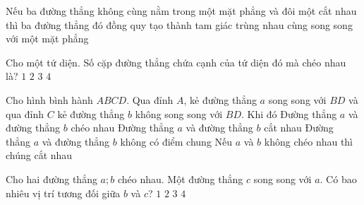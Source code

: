 \begin{ex}%
	Nếu ba đường thẳng không cùng nằm trong một mặt phẳng và đôi một cắt nhau thì ba đường thẳng đó
	\choice
	{\True đồng quy}
	{tạo thành tam giác}
	{trùng nhau}
	{cùng song song với một mặt phẳng}
\end{ex}
\begin{ex}%
	Cho một tứ diện. Số cặp đường thẳng chứa cạnh của tứ diện đó mà chéo nhau là?
	\choice
	{$1$}
	{$2$}
	{\True $3$}
	{$4$}
	\loigiai{
	}
\end{ex}
\begin{ex}%
	Cho hình bình hành $ABCD$. Qua đỉnh $A$, kẻ đường thẳng $a$ song song với $BD$ và qua đỉnh $C$ kẻ đường thẳng $b$ không song song với $BD$. Khi đó
	\choice
	{Đường thẳng $a$ và đường thẳng $b$ chéo nhau}
	{Đường thẳng $a$ và đường thẳng $b$ cắt nhau}
	{Đường thẳng $a$ và đường thẳng $b$ không có điểm chung}
	{\True Nếu $a$ và $b$ không chéo nhau thì chúng cắt nhau}
	\loigiai{
	}
\end{ex}
\begin{ex}%
	Cho hai đường thẳng $a;b$ chéo nhau. Một đường thẳng $c$ song song với $a$. Có bao nhiêu vị trí tương đối giữa $b$ và $c$?
	\choice
	{$1$}
	{\True $2$}
	{$3$}
	{$4$}
\end{ex}

